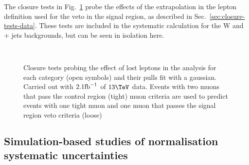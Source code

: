 The closure tests in Fig.~\ref{fig:closureLooseLep} probe the effects
of the extrapolation in the lepton definition used for the veto in the
signal region, as described in Sec.~\ref{sec:closure-tests-data}.
These tests are included in the systematic calculation for the W and
\ttbar + jets backgrounds, but can be seen in isolation here. 

\begin{figure}
  \begin{center}
    ~~
    \caption{Closure tests probing the effect of lost leptons in the
    analysis for each
    \njet category (open symbols) and their pulls fit with a gaussian.
    Carried out with $2.1\text{fb}^{-1}$ of
      $13\tev$ data. Events with two muons that pass the control
      region (tight) muon criteria are used to predict events with one
      tight muon and one muon that passes the signal region veto
      criteria (loose)}
    \label{fig:closureLooseLep}
  \end{center} 
\end{figure}


\subsection{Simulation-based studies of normalisation systematic uncertainties}
\label{sec:mc-systematics}

